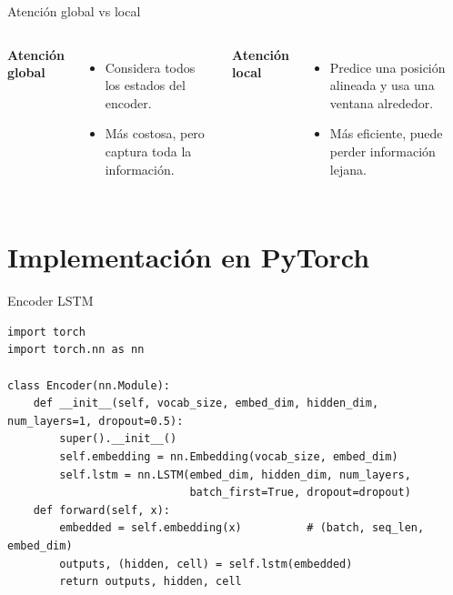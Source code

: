 \documentclass[aspectratio=169, 10pt, xcolor=table]{beamer}
\begin{document}
\begin{frame}{Atención global vs local}
    \begin{columns}[t]
        \textbf{Atención global}
        \begin{itemize}
            \item Considera todos los estados del encoder.
            \item Más costosa, pero captura toda la información.
        \end{itemize}
        \textbf{Atención local}
        \begin{itemize}
            \item Predice una posición alineada y usa una ventana alrededor.
            \item Más eficiente, puede perder información lejana.
        \end{itemize}
    \end{columns}
\end{frame}

\section{Implementación en PyTorch}

\begin{frame}[fragile]{Encoder LSTM}
    \begin{lstlisting}
import torch
import torch.nn as nn

class Encoder(nn.Module):
    def __init__(self, vocab_size, embed_dim, hidden_dim, num_layers=1, dropout=0.5):
        super().__init__()
        self.embedding = nn.Embedding(vocab_size, embed_dim)
        self.lstm = nn.LSTM(embed_dim, hidden_dim, num_layers,
                            batch_first=True, dropout=dropout)
    def forward(self, x):
        embedded = self.embedding(x)          # (batch, seq_len, embed_dim)
        outputs, (hidden, cell) = self.lstm(embedded)
        return outputs, hidden, cell
    \end{lstlisting}
\end{frame}
\end{document}
